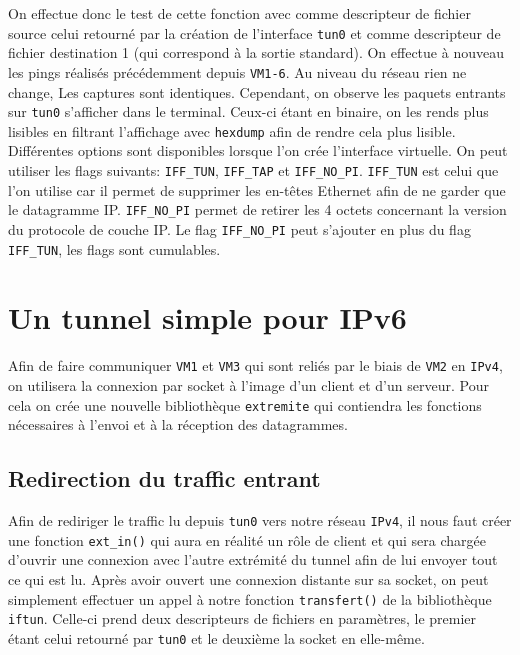 \documentclass[a4paper, 12pt]{article}
\begin{document}
    On effectue donc le test de cette fonction avec comme descripteur de 
    fichier source celui retourné par la création de l'interface \verb+tun0+ et
    comme descripteur de fichier destination 1 (qui correspond à la 
    sortie standard). On effectue à nouveau les pings réalisés précédemment
    depuis \verb+VM1-6+. Au niveau du réseau rien ne change, Les captures sont 
    identiques. Cependant, on observe les paquets entrants sur \verb+tun0+ 
    s'afficher dans le terminal. Ceux-ci étant en binaire, on les rends plus 
    lisibles en filtrant l'affichage avec \verb+hexdump+ afin de rendre cela 
    plus lisible. \\

    Différentes options sont disponibles lorsque l'on crée l'interface 
    virtuelle. On peut utiliser les flags suivants: \verb+IFF_TUN+, 
    \verb+IFF_TAP+ et \verb+IFF_NO_PI+. \verb+IFF_TUN+ est celui que l'on 
    utilise car il permet de supprimer les en-têtes Ethernet afin de ne garder
    que le datagramme IP. \verb+IFF_NO_PI+ permet de retirer les 4 octets 
    concernant la version du protocole de couche IP. Le flag \verb+IFF_NO_PI+ 
    peut s'ajouter en plus du flag \verb+IFF_TUN+, les flags sont cumulables.

    \section{Un tunnel simple pour IPv6}

    Afin de faire communiquer \verb+VM1+ et \verb+VM3+ qui sont reliés par le 
    biais de \verb+VM2+ en \verb+IPv4+, on utilisera la connexion par socket à
    l'image d'un client et d'un serveur. Pour cela on crée une nouvelle 
    bibliothèque \verb+extremite+ qui contiendra les fonctions nécessaires à
    l'envoi et à la réception des datagrammes.

    \subsection{Redirection du traffic entrant}

    Afin de rediriger le traffic lu depuis \verb+tun0+ vers notre réseau 
    \verb+IPv4+, il nous faut créer une fonction \verb+ext_in()+ qui aura en 
    réalité un rôle de client et qui sera chargée d'ouvrir une connexion avec 
    l'autre extrémité du tunnel afin de lui envoyer tout ce qui est lu. Après 
    avoir ouvert une connexion distante sur sa socket, on peut simplement 
    effectuer un appel à notre fonction \verb+transfert()+ de la bibliothèque 
    \verb+iftun+. Celle-ci prend deux descripteurs de fichiers en paramètres, 
    le premier étant celui retourné par \verb+tun0+ et le deuxième la socket 
    en elle-même. \\
\end{document}
